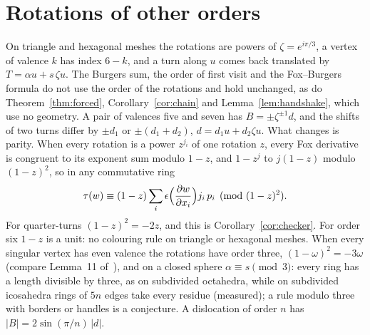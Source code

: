 \documentclass[11pt,a4paper]{article}
\newcommand{\shift}{s}
\begin{document}



\appendix

\section{Rotations of other orders}\label{app:orders}

On triangle and hexagonal meshes the rotations are powers of $\zeta =
e^{i\pi/3}$, a vertex of valence $k$ has index $6 - k$, and a turn along $u$
comes back translated by $T = \alpha u + \shift\, \zeta u$.
The Burgers sum, the order of first visit and the Fox--Burgers formula do not
use the order of the rotations and hold unchanged, as do
Theorem~\ref{thm:forced}, Corollary~\ref{cor:chain} and
Lemma~\ref{lem:handshake}, which use no geometry. A pair of valences five and seven has $B =
\pm\zeta^{\pm1} d$, and the shifts of two turns differ by $\pm d_1$ or
$\pm(d_1 + d_2)$, $d = d_1 u + d_2 \zeta u$. What changes is parity. When every
rotation is a power $z^{j_i}$ of one rotation $z$, every Fox derivative is
congruent to its exponent sum modulo $1 - z$, and $1 - z^j$ to $j(1 - z)$
modulo $(1 - z)^2$, so in any commutative ring
\[
  \tau(w) \equiv (1 - z) \sum_i \epsilon\Bigl(\frac{\partial w}{\partial
  x_i}\Bigr) j_i\, p_i \pmod{(1 - z)^2}.
\]
For quarter-turns $(1 - z)^2 = -2z$, and this is Corollary~\ref{cor:checker}.
For order six $1 - z$ is a unit: no colouring rule on triangle or hexagonal
meshes. When every singular vertex has even valence the rotations have order
three, $(1 - \omega)^2 = -3\omega$ (compare Lemma~11
of~\cite{izmestiev2013torus}), and on a closed sphere $\alpha \equiv \shift
\pmod 3$: every ring has a length divisible by three, as on subdivided
octahedra, while on subdivided icosahedra rings of $5n$ edges take every
residue (measured); a rule modulo three with borders or handles is a
conjecture. A dislocation of order $n$ has $|B| = 2\sin(\pi/n)\,|d|$.
\end{document}
